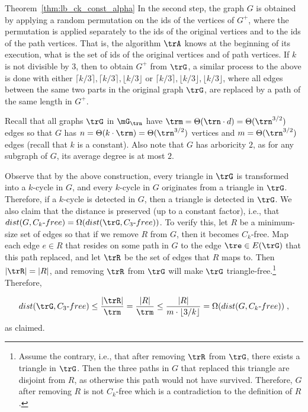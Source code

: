 \begin{proofof}{Theorem~\ref{thm:lb_ck_const_alpha}}
In the second step, the graph $G$ is obtained by applying a random permutation on the ids of the vertices of $G^+$, where the permutation is applied separately to the ids of the original vertices and to the ids of the path vertices. That is, the algorithm $\trA$ knows at the beginning of its execution, what is the set of ids of the original vertices and  of path vertices. If $k$ is not divisible by $3$, then  to obtain $G^+$ from $\trG$, 
a similar process to the above is done with either $\lceil k/3\rceil, \lceil k/3\rceil, \lfloor k/3\rfloor$ or $\lceil k/3\rceil, \lfloor k/3\rfloor, \lfloor k/3\rfloor$, where all edges between the same two parts in the original graph $\trG$, are replaced by a path of the same length in $G^+$.


Recall that all graphs $\trG$ in $\mG_{\trn}$ have $\trm=\Theta(\trn\cdot d)=\Theta(\trn^{3/2})$ edges so that $G$ has $n=\Theta (k\cdot \trm)=\Theta(\trn^{3/2})$ vertices and  $m=\Theta(\trn^{3/2})$ edges (recall that $k$ is a constant). Also note that $G$ has arboricity $2$, as for any subgraph  of $G$, its average degree is at most $2$.  

Observe that by the above construction, every triangle in $\trG$ is transformed into a $k$-cycle in $G$, and every $k$-cycle in $G$ originates from a triangle in $\trG$. Therefore, if a $k$-cycle is detected in $G$, then a triangle is detected in $\trG$.
We also claim that the distance is preserved (up to a constant factor), i.e., that $dist(G, C_k\mbox{-}free)= \Omega(dist(\trG, C_3\mbox{-}free))$. 
To verify this, let $R$ be a 
minimum-size set of edges so that if we remove $R$ from $G$, then it becomes $C_k$-free. Map each edge $e\in R$ that resides on some path in $G$ to the edge $\tre\in E(\trG)$ that this path replaced, and let $\trR$ be the set of edges that $R$ maps to. Then $|\trR|= |R|$, and  removing $\trR$ from $\trG$ will make $\trG$ triangle-free.\footnote{Assume the contrary, i.e., that after removing $\trR$ from $\trG$, there exists a triangle in $\trG$. Then the three paths in $G$ that replaced this triangle are disjoint from $R$, as otherwise this path would not have survived. Therefore, $G$ after removing $R$ is not $C_k$-free which is a contradiction to the definition of $R$.} Therefore,

\begin{equation} dist(\trG, C_3\mbox{-}free)\leq \frac{|\trR|}{\trm}= \frac{|R|}{\trm}\leq \frac{|R|}{m\cdot \lfloor 3/k\rfloor}=\Omega(dist(G,C_k\mbox{-}free))\;,
\end{equation}
as claimed.



\end{proofof}
